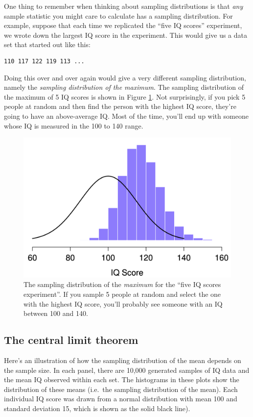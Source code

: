\documentclass[
  11pt,
  a4paper,
  twoside,symmetric,openright]{book}
\theoremstyle{break}
\theoremstyle{break}
\begin{document}
One thing to remember when thinking about sampling distributions is that \emph{any} sample statistic you might care to calculate has a sampling distribution. For example, suppose that each time we replicated the ``five IQ scores'' experiment, we wrote down the largest IQ score in the experiment. This would give us a data set that started out like this:

\begin{verbatim}
110 117 122 119 113 ... 
\end{verbatim}

Doing this over and over again would give a very different sampling distribution, namely the \emph{sampling distribution of the maximum}. The sampling distribution of the maximum of 5 IQ scores is shown in Figure \ref{fig:sampdistmax}. Not surprisingly, if you pick 5 people at random and then find the person with the highest IQ score, they're going to have an above-average IQ. Most of the time, you'll end up with someone whose IQ is measured in the 100 to 140 range.



\begin{figure}

{\centering \includegraphics[width=0.6\linewidth]{resources/image/sampleDistMax} 

}

\caption{The sampling distribution of the \emph{maximum} for the ``five IQ scores experiment''. If you sample 5 people at random and select the one with the highest IQ score, you'll probably see someone with an IQ between 100 and 140.}\label{fig:sampdistmax}
\end{figure}

\subsection{The central limit theorem}\label{clt}

Here's an illustration of how the sampling distribution of the mean depends on the sample size. In each panel, there are 10,000 generated samples of IQ data and the mean IQ observed within each set. The histograms in these plots show the distribution of these means (i.e.~the sampling distribution of the mean). Each individual IQ score was drawn from a normal distribution with mean 100 and standard deviation 15, which is shown as the solid black line).
\end{document}
